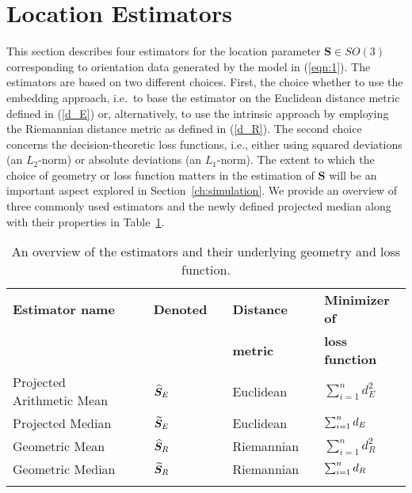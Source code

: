 \section{Location Estimators}\label{sec:estimators}
This section describes four estimators for the location parameter $\bm{S}\in SO(3)$ corresponding to orientation data generated by the model in (\ref{eqn:1}). The estimators are based on two different choices. First, the choice whether to use the embedding approach, i.e.~to base the estimator on the Euclidean distance metric  defined in (\ref{d_E}) or, alternatively, to use the intrinsic approach by employing the Riemannian distance metric as defined in (\ref{d_R}). The second choice concerns the decision-theoretic loss functions, i.e., either using squared deviations  (an $L_2$-norm) or  absolute deviations (an $L_1$-norm).  The extent to which the choice of geometry or loss function matters in the estimation of $\bm{S}$ will be an important aspect explored in Section~\ref{ch:simulation}.   We provide an overview of three commonly used estimators and the newly defined projected median along with their properties in Table~\ref{tab:ests.sum}.


\begin{table}[h]
\caption{An overview of the estimators and their underlying geometry and loss function.}  \label{tab:ests.sum}
\centering
\begin{tabular}{ lclclcl}\hline
\rule[2mm]{0mm}{1mm} \textbf{Estimator name} & & \textbf{Denoted} & & \textbf{Distance} &&\textbf{Minimizer of}\\ 
\rule[2mm]{0mm}{1mm}  & &  & & \textbf{metric} &&\textbf{loss function}\\ 
\hline \hline 
\rule[2mm]{0mm}{6mm} Projected Arithmetic Mean & & ${\widehat{\bm S}_E}$ & & Euclidean &&$\sum_{i=1}^n d^2_E$  \\
\rule[2mm]{0mm}{6mm} Projected Median & & ${\widetilde{\bm S}_E}$ & & Euclidean && $\sum_{i=1}^n{d_E}$ \\
\rule[2mm]{0mm}{6mm} Geometric Mean & & ${\widehat{\bm S}_R}$&  & Riemannian && $\sum_{i=1}^n d^2_R$\\
\rule[2mm]{0mm}{6mm} Geometric Median & & ${\widetilde{\bm S}_R}$&  & Riemannian &&$\sum_{i=1}^n{d_R}$ \\[-7mm] 
\rule[2mm]{0mm}{6mm} & & & & \\ \hline
\end{tabular}
\end{table}

